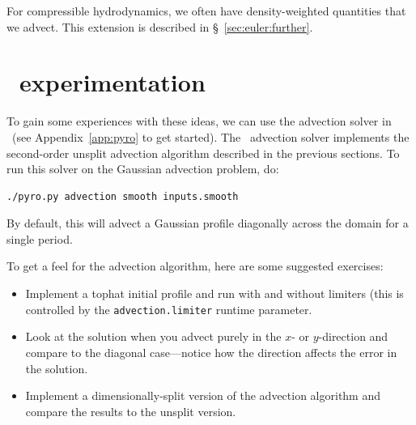 \begin{itemize}
  
  For compressible hydrodynamics, we often have density-weighted quantities
  that we advect.  This extension is described in \S~\ref{sec:euler:further}.

\end{itemize}


\section{\pyro\ experimentation}

To gain some experiences with these ideas, we can use the advection 
solver in \pyro\ (see Appendix~\ref{app:pyro} to get started).
The \pyro\ advection solver implements the second-order unsplit
advection algorithm described in the previous sections.  To run
this solver on the Gaussian advection problem, do:
\begin{verbatim}
./pyro.py advection smooth inputs.smooth
\end{verbatim}
By default, this will advect a Gaussian profile diagonally across the
domain for a single period.

To get a feel for the advection algorithm, here are some suggested
exercises:
\begin{itemize}
\item Implement a tophat initial profile and run with and without limiters
  (this is controlled by the {\tt advection.limiter} runtime parameter.

\item Look at the solution when you advect purely in the $x$- or $y$-direction
and compare to the diagonal case---notice how the direction affects the
error in the solution.

\item Implement a dimensionally-split version of the advection algorithm
and compare the results to the unsplit version.
\end{itemize}
